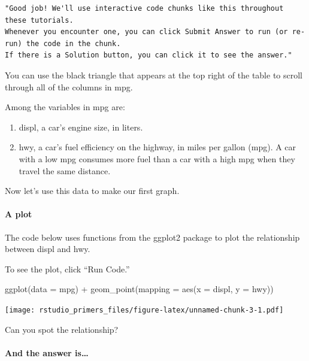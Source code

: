 \documentclass[
]{article}
\newenvironment{Shaded}{\begin{snugshade}}{\end{snugshade}}
\newcommand{\AttributeTok}[1]{\textcolor[rgb]{0.77,0.63,0.00}{#1}}
\newcommand{\FunctionTok}[1]{\textcolor[rgb]{0.00,0.00,0.00}{#1}}
\newcommand{\NormalTok}[1]{#1}
\newcommand{\SpecialCharTok}[1]{\textcolor[rgb]{0.00,0.00,0.00}{#1}}
\providecommand{\tightlist}{%
  \setlength{\itemsep}{0pt}\setlength{\parskip}{0pt}}
\begin{document}
\begin{verbatim}
"Good job! We'll use interactive code chunks like this throughout these tutorials. 
Whenever you encounter one, you can click Submit Answer to run (or re-run) the code in the chunk. 
If there is a Solution button, you can click it to see the answer."
\end{verbatim}

You can use the black triangle that appears at the top right of the
table to scroll through all of the columns in mpg.

Among the variables in mpg are:

\begin{enumerate}
\def\labelenumi{\arabic{enumi}.}
\tightlist
\item
  displ, a car's engine size, in liters.
\item
  hwy, a car's fuel efficiency on the highway, in miles per gallon
  (mpg). A car with a low mpg consumes more fuel than a car with a high
  mpg when they travel the same distance.
\end{enumerate}

Now let's use this data to make our first graph.

\hypertarget{a-plot}{%
\paragraph{A plot}\label{a-plot}}

The code below uses functions from the ggplot2 package to plot the
relationship between displ and hwy.

To see the plot, click ``Run Code.''

\begin{Shaded}
\begin{Highlighting}[]
\FunctionTok{ggplot}\NormalTok{(}\AttributeTok{data =}\NormalTok{ mpg) }\SpecialCharTok{+} 
  \FunctionTok{geom\_point}\NormalTok{(}\AttributeTok{mapping =} \FunctionTok{aes}\NormalTok{(}\AttributeTok{x =}\NormalTok{ displ, }\AttributeTok{y =}\NormalTok{ hwy))}
\end{Highlighting}
\end{Shaded}

\texttt{[image: rstudio\_primers\_files/figure-latex/unnamed-chunk-3-1.pdf]}

Can you spot the relationship?

\hypertarget{and-the-answer-is}{%
\paragraph{And the answer is\ldots{}}\label{and-the-answer-is}}
\end{document}
